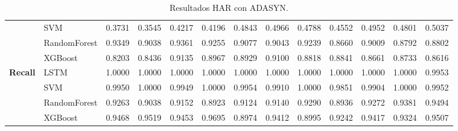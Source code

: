 \begin{table}[h]
\begin{adjustbox}{max width=15cm}
\begin{tabular}{|c|l|r|r|r|r|r|r|r|r|r|r|r|}
			& SVM &  0.3731 &  0.3545 &  0.4217 &  0.4196 &  0.4843 &  0.4966 &  0.4788 &  0.4552 &  0.4952 &  0.4801 &  0.5037 \\
			& RandomForest &  0.9349 &  0.9038 &  0.9361 &  0.9255 &  0.9077 &  0.9043 &  0.9239 &  0.8660 &  0.9009 &  0.8792 &  0.8802 \\
			& XGBoost &  0.8203 &  0.8436 &  0.9135 &  0.8967 &  0.8929 &  0.9100 &  0.8818 &  0.8841 &  0.8661 &  0.8733 &  0.8616 \\
			\hline
			\textbf{Recall} & LSTM &  1.0000 &  1.0000 &  1.0000 &  1.0000 &  1.0000 &  1.0000 &  1.0000 &  1.0000 &  1.0000 &  1.0000 &  0.9953 \\
			& SVM &  0.9950 &  1.0000 &  0.9949 &  1.0000 &  0.9954 &  0.9910 &  1.0000 &  0.9851 &  0.9904 &  1.0000 &  0.9952 \\
			& RandomForest &  0.9263 &  0.9038 &  0.9152 &  0.8923 &  0.9124 &  0.9140 &  0.9290 &  0.8936 &  0.9272 &  0.9381 &  0.9494 \\
			& XGBoost &  0.9468 &  0.9519 &  0.9453 &  0.9695 &  0.8974 &  0.9412 &  0.8995 &  0.9242 &  0.9417 &  0.9324 &  0.9507 \\
			\hline
		\end{tabular}
	\end{adjustbox}
	\caption{Resultados HAR con ADASYN.}
	\label{tab:HAR_ADASYN}
\end{table}

